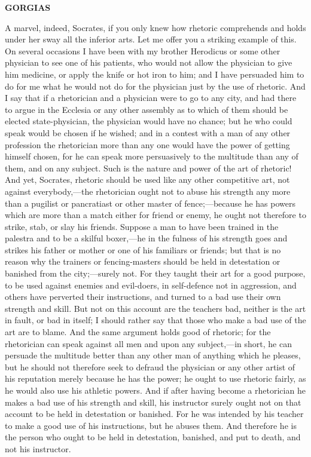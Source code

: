 \documentclass[11pt,letter]{article}
\begin{document}
\par \textbf{GORGIAS}
\par   A marvel, indeed, Socrates, if you only knew how rhetoric comprehends and holds under her sway all the inferior arts. Let me offer you a striking example of this. On several occasions I have been with my brother Herodicus or some other physician to see one of his patients, who would not allow the physician to give him medicine, or apply the knife or hot iron to him; and I have persuaded him to do for me what he would not do for the physician just by the use of rhetoric. And I say that if a rhetorician and a physician were to go to any city, and had there to argue in the Ecclesia or any other assembly as to which of them should be elected state-physician, the physician would have no chance; but he who could speak would be chosen if he wished; and in a contest with a man of any other profession the rhetorician more than any one would have the power of getting himself chosen, for he can speak more persuasively to the multitude than any of them, and on any subject. Such is the nature and power of the art of rhetoric! And yet, Socrates, rhetoric should be used like any other competitive art, not against everybody,—the rhetorician ought not to abuse his strength any more than a pugilist or pancratiast or other master of fence;—because he has powers which are more than a match either for friend or enemy, he ought not therefore to strike, stab, or slay his friends. Suppose a man to have been trained in the palestra and to be a skilful boxer,—he in the fulness of his strength goes and strikes his father or mother or one of his familiars or friends; but that is no reason why the trainers or fencing-masters should be held in detestation or banished from the city;—surely not. For they taught their art for a good purpose, to be used against enemies and evil-doers, in self-defence not in aggression, and others have perverted their instructions, and turned to a bad use their own strength and skill. But not on this account are the teachers bad, neither is the art in fault, or bad in itself; I should rather say that those who make a bad use of the art are to blame. And the same argument holds good of rhetoric; for the rhetorician can speak against all men and upon any subject,—in short, he can persuade the multitude better than any other man of anything which he pleases, but he should not therefore seek to defraud the physician or any other artist of his reputation merely because he has the power; he ought to use rhetoric fairly, as he would also use his athletic powers. And if after having become a rhetorician he makes a bad use of his strength and skill, his instructor surely ought not on that account to be held in detestation or banished. For he was intended by his teacher to make a good use of his instructions, but he abuses them. And therefore he is the person who ought to be held in detestation, banished, and put to death, and not his instructor.
\end{document}
